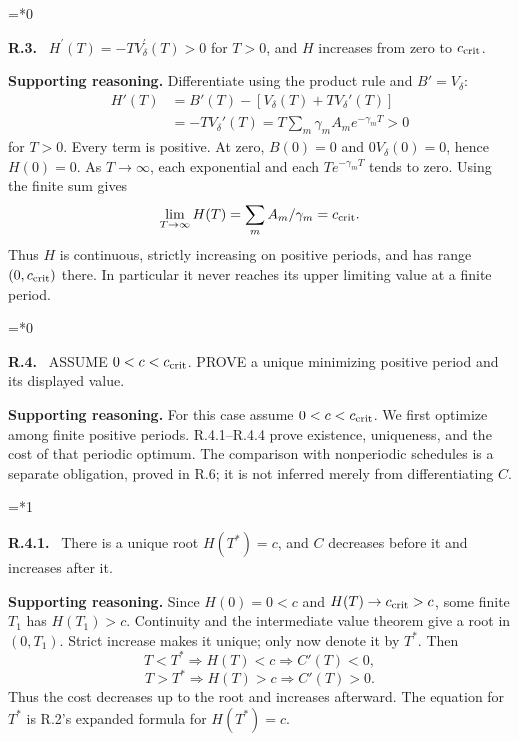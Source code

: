 \documentclass[12pt,letterpaper]{article}
\newenvironment{proofstep}[2]{%
  \begin{list}{}{\leftmargin=\dimexpr 0.17in*#2\relax%
  \setlength{\rightmargin}{0pt}\setlength{\topsep}{5pt}\setlength{\parsep}{2pt}}%
  \item[]\textbf{\textcolor{ink}{#1.}}\ }{\end{list}}
\begin{document}
\begin{proofstep}{R.3}{0}
\label{step:R.3}
$H^{\prime}(T)=-TV_\delta^{\prime}(T)>0$ for $T>0$, and $H$ increases from zero to $c_{\rm crit}$.

\textbf{Supporting reasoning.}
Differentiate using the product rule and $B'=V_\delta$:
\begin{align*}
H'(T)&=B'(T)-[V_\delta(T)+TV_\delta'(T)]\\
&=-TV_\delta'(T)=T\sum_m\gamma_m A_m e^{-\gamma_mT}>0
\end{align*}
for $T>0$. Every term is positive. At zero, $B(0)=0$ and $0V_\delta(0)=0$, hence $H(0)=0$. As $T\to\infty$, each exponential and each $Te^{-\gamma_mT}$ tends to zero. Using the finite sum gives
\[
\lim_{T\to\infty}H(T)=\sum_m A_m/\gamma_m=c_{\rm crit}.
\]
Thus $H$ is continuous, strictly increasing on positive periods, and has range $(0,c_{\rm crit})$ there. In particular it never reaches its upper limiting value at a finite period.
\par{}
\end{proofstep}

\begin{proofstep}{R.4}{0}
\label{step:R.4}
ASSUME $0<c<c_{\rm crit}$. PROVE a unique minimizing positive period and its displayed value.

\textbf{Supporting reasoning.}
For this case assume $0<c<c_{\rm crit}$. We first optimize among finite positive periods. R.4.1--R.4.4 prove existence, uniqueness, and the cost of that periodic optimum. The comparison with nonperiodic schedules is a separate obligation, proved in R.6; it is not inferred merely from differentiating $C$.
\par{}
\end{proofstep}

\begin{proofstep}{R.4.1}{1}
\label{step:R.4.1}
There is a unique root $H(T^*)=c$, and $C$ decreases before it and increases after it.

\textbf{Supporting reasoning.}
Since $H(0)=0<c$ and $H(T)\to c_{\rm crit}>c$, some finite $T_1$ has $H(T_1)>c$. Continuity and the intermediate value theorem give a root in $(0,T_1)$. Strict increase makes it unique; only now denote it by $T^*$. Then
\[
T<T^*\Rightarrow H(T)<c\Rightarrow C'(T)<0,
\]
\[
T>T^*\Rightarrow H(T)>c\Rightarrow C'(T)>0.
\]
Thus the cost decreases up to the root and increases afterward. The equation for $T^*$ is R.2's expanded formula for $H(T^*)=c$.
\par{}
\end{proofstep}
\end{document}
